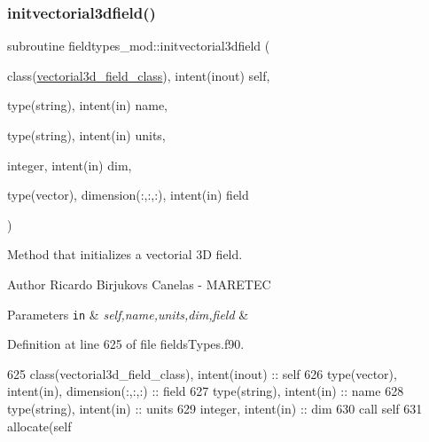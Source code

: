 \subsubsection{\texorpdfstring{initvectorial3dfield()}{initvectorial3dfield()}}
{\footnotesize\ttfamily subroutine fieldtypes\+\_\+mod\+::initvectorial3dfield (\begin{DoxyParamCaption}\item[{class(\mbox{\hyperlink{structfieldtypes__mod_1_1vectorial3d__field__class}{vectorial3d\+\_\+field\+\_\+class}}), intent(inout)}]{self,  }\item[{type(string), intent(in)}]{name,  }\item[{type(string), intent(in)}]{units,  }\item[{integer, intent(in)}]{dim,  }\item[{type(vector), dimension(\+:,\+:,\+:), intent(in)}]{field }\end{DoxyParamCaption})\hspace{0.3cm}{\ttfamily [private]}}



Method that initializes a vectorial 3D field. 

\begin{DoxyAuthor}{Author}
Ricardo Birjukovs Canelas -\/ M\+A\+R\+E\+T\+EC 
\end{DoxyAuthor}

\begin{DoxyParams}[1]{Parameters}
\mbox{\tt in}  & {\em self,name,units,dim,field} & \\
\hline
\end{DoxyParams}


Definition at line 625 of file fields\+Types.\+f90.


\begin{DoxyCode}
625     \textcolor{keywordtype}{class}(vectorial3d\_field\_class), \textcolor{keywordtype}{intent(inout)} :: self
626     \textcolor{keywordtype}{type}(vector), \textcolor{keywordtype}{intent(in)}, \textcolor{keywordtype}{dimension(:,:,:)} :: field
627     \textcolor{keywordtype}{type}(string), \textcolor{keywordtype}{intent(in)} :: name
628     \textcolor{keywordtype}{type}(string), \textcolor{keywordtype}{intent(in)} :: units
629     \textcolor{keywordtype}{integer}, \textcolor{keywordtype}{intent(in)} :: dim
630     \textcolor{keyword}{call }self%
631     \textcolor{keyword}{allocate}(self%
\end{DoxyCode}
\mbox{\label{namespacefieldtypes__mod_ad458710e4a2d6c40a3dfa7f19481cd5a}} 
